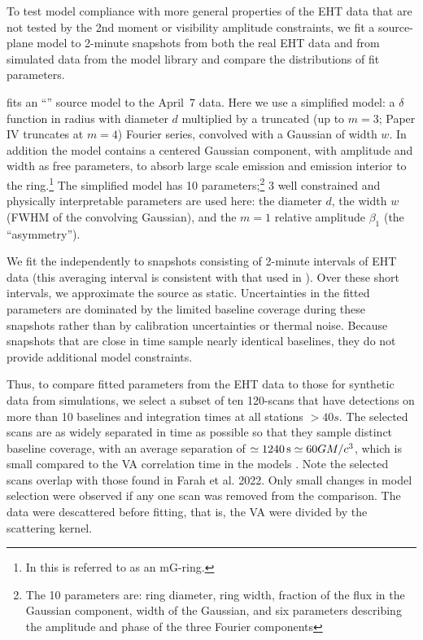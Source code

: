 To test model compliance with more general properties of the EHT data that are not tested by the 2nd moment or visibility amplitude constraints, we fit a source-plane model to 2-minute snapshots from both the real EHT data and from simulated data from the model library and compare the distributions of fit parameters.

 fits an ``\mring'' source model to the April~7 data.  Here we use a simplified \mring model: a $\delta$ function in radius with diameter $d$ multiplied by a truncated (up to $m = 3$; Paper IV truncates at $m = 4$) Fourier series, convolved with a Gaussian of width $w$.  In addition the model contains a centered Gaussian component, with amplitude and width as free parameters, to absorb large scale emission and emission interior to the ring.\footnote{In \cite{PaperIV} this is referred to as an mG-ring.}  The simplified \mring model has 10 parameters;\footnote{The 10 parameters are: ring diameter, ring width, fraction of the flux in the Gaussian component, width of the Gaussian, and six parameters describing the amplitude and phase of the three Fourier components} 3 well constrained and physically interpretable parameters are used here: the \mring diameter $d$, the \mring width $w$ (FWHM of the convolving  Gaussian), and the $m=1$ relative amplitude $\beta_1$ (the ``asymmetry'').

We fit the \mring independently to snapshots consisting of 2-minute intervals of EHT data (this averaging interval is consistent with that used in ). Over these short intervals, we approximate the source as static.  Uncertainties in the fitted \mring parameters are dominated by the limited baseline coverage during these snapshots rather than by calibration uncertainties or thermal noise. Because snapshots that are close in time sample nearly identical baselines, they do not provide additional model constraints.

Thus, to compare fitted \mring parameters from the EHT data to those for synthetic data from simulations, we select a subset of ten 120-\sec scans  that have detections on more than 10 baselines and integration times at all stations $> 40s$. The selected scans are as widely separated in time as possible so that they sample distinct baseline coverage, with an average separation of $\simeq 1240\,\mathrm{s} \simeq 60 GM/c^3$, which is small compared to the VA correlation time in the models \citep{Georgiev_2022}.  Note the selected scans overlap with those found in Farah et al. 2022.
Only small changes in model selection were observed if any one scan was removed from the comparison.  The data were descattered before fitting, that is, the VA were divided by the scattering kernel. 

